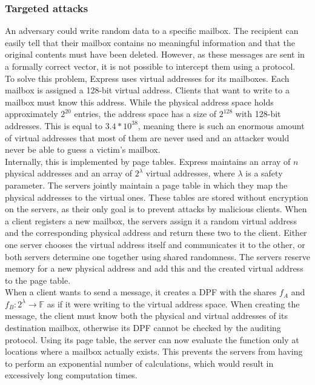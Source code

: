 \documentclass[a4paper]{article}
\begin{document}
\subsubsection{Targeted attacks}
\label{subsubsec:targeted}
An adversary could write random data to a specific mailbox. The recipient can easily tell that their mailbox contains no meaningful information and that the original contents must have been deleted. However, as these messages are sent in a formally correct vector, it is not possible to intercept them using a protocol. \\
To solve this problem, Express uses virtual addresses for its mailboxes. Each mailbox is assigned a 128-bit virtual address. Clients that want to write to a mailbox must know this address. While the physical address space holds approximately $2^{20}$ entries, the address space has a size of $2^{128}$ with 128-bit addresses. This is equal to $3.4 * 10^{38}$, meaning there is such an enormous amount of virtual addresses that most of them are never used and an attacker would never be able to guess a victim's mailbox.  \\
Internally, this is implemented by page tables. Express maintains an array of $n$ physical addresses and an array of $2^\lambda$ virtual addresses, where $\lambda$ is a safety parameter. The servers jointly maintain a page table in which they map the physical addresses to the virtual ones. These tables are stored without encryption on the servers, as their only goal is to prevent attacks by malicious clients. When a client registers a new mailbox, the servers assign it a random virtual address and the corresponding physical address and return these two to the client. Either one server chooses the virtual address itself and communicates it to the other, or both servers determine one together using shared randomness. The servers reserve memory for a new physical address and add this and the created virtual address to the page table. \\
When a client wants to send a message, it creates a DPF with the shares $f_A$ and $f_B: 2^\lambda \rightarrow \mathbb{F}$ as if it were writing to the virtual address space. When creating the message, the client must know both the physical and virtual addresses of its destination mailbox, otherwise its DPF cannot be checked by the auditing protocol. Using its page table, the server can now evaluate the function only at locations where a mailbox actually exists. This prevents the servers from having to perform an exponential number of calculations, which would result in excessively long computation times. 
\end{document}
